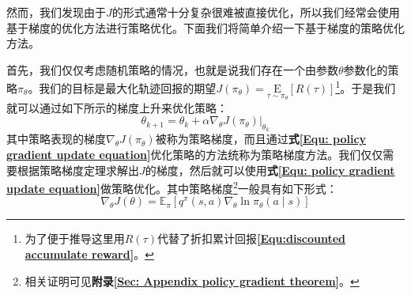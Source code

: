 然而，我们发现由于$J$的形式通常十分复杂很难被直接优化，所以我们经常会使用基于梯度的优化方法进行策略优化。下面我们将简单介绍一下基于梯度的策略优化方法。

首先，我们仅仅考虑随机策略的情况，也就是说我们存在一个由参数$\theta$参数化的策略$\pi_\theta$。我们的目标是最大化轨迹回报的期望$J\left(\pi_{\theta}\right)=\underset{\tau \sim \pi_{\theta}}{\mathrm{E}}[R(\tau)]$\footnote{为了便于推导这里用$R(\tau)$代替了折扣累计回报\textbf{\eqref{Equ:discounted accumulate reward}}。}。于是我们就可以通过如下所示的梯度上升来优化策略：
\begin{equation}
\label{Equ: policy gradient update equation}
    \theta_{k+1}=\theta_{k}+\left.\alpha \nabla_{\theta} J\left(\pi_{\theta}\right)\right|_{\theta_{k}}
\end{equation}
其中策略表现的梯度$\nabla_{\theta} J\left(\pi_{\theta}\right)$被称为策略梯度，而且通过\textbf{式\eqref{Equ: policy gradient update equation}}优化策略的方法统称为策略梯度方法。我们仅仅需要根据策略梯度定理求解出$J$的梯度，然后就可以使用\textbf{式\eqref{Equ: policy gradient update equation}}做策略优化。其中策略梯度\footnote{相关证明可见\textbf{附录\ref{Sec: Appendix  policy gradient theorem}}。}一般具有如下形式：
\begin{equation}
\label{Equ: policy gradient theorem}
    \nabla_{\theta} J(\theta)=\mathbb{E}_{\pi}\left[q^{\pi}(s, a) \nabla_{\theta} \ln \pi_{\theta}(a \mid s)\right]
\end{equation}

